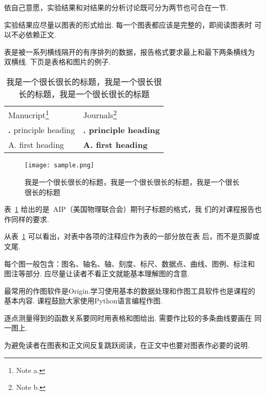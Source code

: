 \documentclass[aps,pre,12pt,preprint,onecolumn,showpacs,showkeys]{revtex4-1}
\begin{document}
依自己意愿，实验结果和对结果的分析讨论既可分为两节也可合在一节.

实验结果应尽量以图表的形式给出. 每一个图表都应该是完整的，即阅读图表时
可以不必依赖正文.

表是被一系列横线隔开的有序排列的数据，报告格式要求最上和最下两条横线为
双横线. 下页是表格和图片的例子.

\begin{table}[t]
  \caption{\label{tab:table1}%
    我是一个很长很长的标题，我是一个很长很长的标题，我是一个很长很长的标题}
\begin{ruledtabular}
  \begin{tabular}{ll}
    Manucript\footnote{Note a.} & Journals\footnote{Note b.} \\
    \colrule
{\bf\uppercase\expandafter{\romannumeral 1}.} principle heading & {\bf\uppercase\expandafter{\romannumeral 1}. principle heading} \\
A. first heading & {\bf A. first heading} \\
\end{tabular}
\end{ruledtabular}
\end{table}

\begin{figure}[t]
  \centering
\texttt{[image: sample.png]}
\caption{\label{fig:gax}%
我是一个很长很长的标题，我是一个很长很长的标题，我是一个很长很长的标题}
\end{figure}

表~\ref{tab:table1} 给出的是~AIP（美国物理联合会）期刊子标题的格式，我
们的对课程报告也作同样的要求.

从表~\ref{tab:table1} 可以看出，对表中各项的注释应作为表的一部分放在表
后，而不是页脚或文尾.

每个图一般包含：图名、轴名、轴、刻度、标尺、数据点、曲线、图例、标注和
图注等部分. 应尽量让读者不看正文就能基本理解图的含意.

最常用的作图软件是Origin.学习使用基本的数据处理和作图工具软件也是课程的
基本内容. 课程鼓励大家使用Python语言编程作图.

逐点测量得到的函数关系要同时用表格和图给出. 需要作比较的多条曲线要画在
同一图上.

为避免读者在图表和正文间反复跳跃阅读，在正文中也要对图表作必要的说明.
\end{document}
